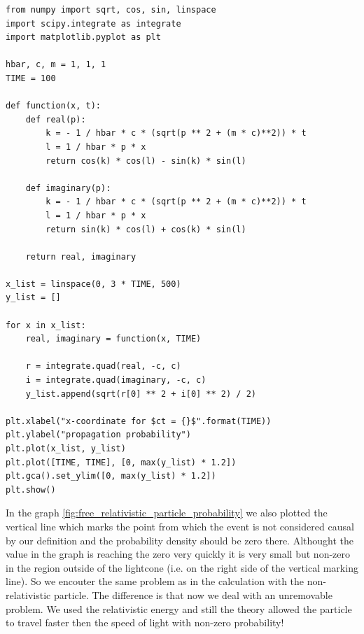 \clearpage

\begin{code}
    \label{code:free_relativistic_particle_amplitude}
    \begin{verbatim}
from numpy import sqrt, cos, sin, linspace
import scipy.integrate as integrate
import matplotlib.pyplot as plt

hbar, c, m = 1, 1, 1
TIME = 100

def function(x, t):
    def real(p):
        k = - 1 / hbar * c * (sqrt(p ** 2 + (m * c)**2)) * t
        l = 1 / hbar * p * x
        return cos(k) * cos(l) - sin(k) * sin(l)

    def imaginary(p):
        k = - 1 / hbar * c * (sqrt(p ** 2 + (m * c)**2)) * t
        l = 1 / hbar * p * x
        return sin(k) * cos(l) + cos(k) * sin(l)

    return real, imaginary

x_list = linspace(0, 3 * TIME, 500)
y_list = []

for x in x_list:
    real, imaginary = function(x, TIME)

    r = integrate.quad(real, -c, c)
    i = integrate.quad(imaginary, -c, c)
    y_list.append(sqrt(r[0] ** 2 + i[0] ** 2) / 2)

plt.xlabel("x-coordinate for $ct = {}$".format(TIME))
plt.ylabel("propagation probability")
plt.plot(x_list, y_list)
plt.plot([TIME, TIME], [0, max(y_list) * 1.2])
plt.gca().set_ylim([0, max(y_list) * 1.2])
plt.show()
    \end{verbatim}
\end{code}

\clearpage

In the graph \ref{fig:free_relativistic_particle_probability} we also plotted the vertical line which marks the point from which 
the event is not considered causal by our definition and the probability density should be zero there. Althought the value
in the graph is reaching the zero very quickly it is very small but non-zero in the region outside of the lightcone (i.e. on the 
right side of the vertical marking line). So we encouter the same problem as in the calculation with the non-relativistic
particle. The difference is that now we deal with an unremovable problem. We used the relativistic energy and still the theory
allowed the particle to travel faster then the speed of light with non-zero probability!
